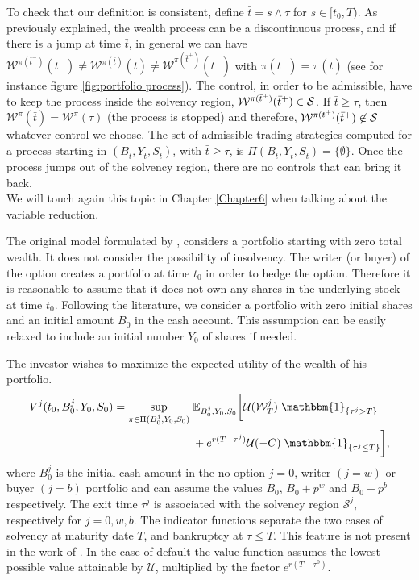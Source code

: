 To check that our definition is consistent, define $\bar t = s \wedge \tau$ for $s\in[t_0,T)$. As previously explained, the wealth process can be a discontinuous process, 
and if there is a
jump at time $\bar t$, in general we can have $\mathcal{W}^{\pi(\bar t^-)}(\bar t^-) \not = \mathcal{W}^{\pi(\bar t)}(\bar t) \not = \mathcal{W}^{\pi(\bar t^+)}(\bar t^+) $ with
$\pi(\bar t^-) = \pi(\bar t)$ (see for instance figure \ref{fig:portfolio process}). 
The control, in order to be admissible, have to keep the process inside the solvency region, $\mathcal{W}^{\pi(\bar t^+)}(\bar t^+) \in \mathcal{S}$.
If $\bar t \geq \tau$, then $\mathcal{W}^{\pi}(\bar t) = \mathcal{W}^{\pi}(\tau)$ (the process is stopped) and therefore, $\mathcal{W}^{\pi(\bar t^+)}(\bar t^+) \not \in \mathcal{S}$ whatever
control we choose.
The set of admissible trading strategies computed for a process starting in $(B_{\bar t},Y_{\bar t},S_{\bar t})$, with $\bar t \geq \tau$, 
is $\Pi(B_{\bar t},Y_{\bar t},S_{\bar t}) = \{ \emptyset \}$.
Once the process jumps out of the solvency region, there are no controls that can bring it back.\\
We will touch again this topic in Chapter \ref{Chapter6} when talking about the variable reduction.
\begin{Remark}
The original model formulated by \cite{HoNe89}, 
considers a portfolio starting with zero total wealth. 
It does not consider the possibility of insolvency.
The writer (or buyer) of the option creates a portfolio at time $t_0$ in order to hedge the option.
Therefore it is reasonable to assume that it does not own any shares in the underlying stock at time $t_0$. 
Following the literature, we consider a portfolio with zero initial shares and an initial amount $B_0$ in the 
cash account. This assumption can be easily relaxed to include an initial number $Y_0$ of shares if needed.
\end{Remark}

The investor wishes to maximize the expected utility of the wealth of his portfolio. 
\begin{align}\label{max_probl1}
V^j(t_0,B_0^j,Y_0,S_0) = \sup_{\pi \in \Pi(B_0^j,Y_0,S_0)} \;& \E_{B_0^j,Y_0,S_0}\biggl[ 
            \mathcal{U}(\mathcal{W}^j_T) \; \mathbbm{1}_{\{\tau^j > T\}} \\ \nonumber
             &+ e^{r(T-\tau^j)}\mathcal{U}(-C) \; 
             \mathbbm{1}_{\{\tau^j \leq T\}}\biggr], 
\end{align}
where $B_0^j$ is the initial cash amount in the no-option $j=0$, writer $(j=w)$ or buyer $(j=b)$ portfolio and can assume the values $B_0$, $B_0+p^w$ and $B_0-p^b$ respectively. 
The exit time $\tau^j$ is associated with the solvency region $ \mathcal{S}^j$, respectively for $j=0,w,b$.
The indicator functions separate the two cases of solvency at maturity date $T$, 
and bankruptcy at $\tau \leq T$. This feature is not present in the work of \cite{DaPaZa93}.
In the case of default the value function assumes the lowest possible
value attainable by $\mathcal{U}$, multiplied by the factor $e^{r(T-\tau^0)}$. 



